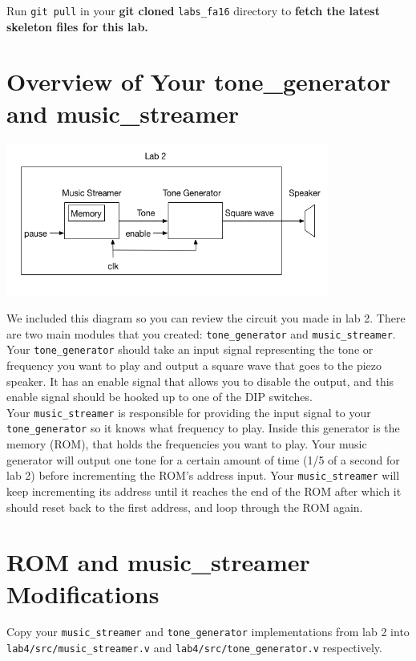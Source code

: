 \documentclass[11pt]{article}
\begin{document}
Run \verb|git pull| in your \textbf{git cloned} \verb|labs_fa16| directory to \textbf{fetch the latest skeleton files for this lab.}

\section{Overview of Your tone\_generator and music\_streamer}

\begin{center}
\includegraphics[height=5cm]{images/lab2_fig1.png}
\end{center}

We included this diagram so you can review the circuit you made in lab 2. There are two main modules that you created: \verb|tone_generator| and \verb|music_streamer|. \\

Your \verb|tone_generator| should take an input signal representing the tone or frequency you want to play and output a square wave that goes to the piezo speaker. It has an enable signal that allows you to disable the output, and this enable signal should be hooked up to one of the DIP switches.  \\

Your \verb|music_streamer| is responsible for providing the input signal to your \verb|tone_generator| so it knows what frequency to play. Inside this generator is the memory (ROM), that holds the frequencies you want to play. Your music generator will output one tone for a certain amount of time (1/5 of a second for lab 2) before incrementing the ROM's address input. Your \verb|music_streamer| will keep incrementing its address until it reaches the end of the ROM after which it should reset back to the first address, and loop through the ROM again.

\section{ROM and music\_streamer Modifications}
Copy your \verb|music_streamer| and \verb|tone_generator| implementations from lab 2 into \verb|lab4/src/music_streamer.v| and \verb|lab4/src/tone_generator.v| respectively. 
\end{document}
